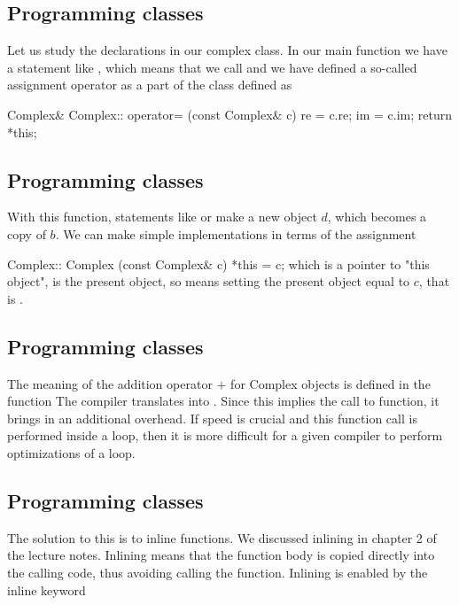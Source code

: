 \documentclass[%
twoside,                 %
final,                   %
10pt]{article}
\begin{document}
{{{{{{{{%
\subsection{Programming classes}

Let us study the declarations in our complex class.
In our main function we have a statement like , which means
that we call  and we have defined a so-called assignment operator
as a part of the class defined as

\bcppcod
Complex& Complex:: operator= (const Complex& c)
{
   re = c.re;
   im = c.im;
   return *this;
}
\ecppcod

\subsection{Programming classes}

With this function, statements like
 or 
make a new object $d$, which becomes a copy of $b$.
We can make simple implementations in terms of the assignment

\bcppcod
Complex:: Complex (const Complex& c)
{ *this = c; }
\ecppcod
which  is a pointer to "this object",  is the present object,
so  means setting the present object equal to $c$, that is
.

\subsection{Programming classes}

The meaning of the addition operator $+$ for Complex objects is defined in the
function
The compiler translates  into .
Since this implies the call to function, it brings in an additional overhead. If speed
is crucial and this function call is performed inside a loop, then it is more difficult for a
given compiler to perform optimizations of a loop.

\subsection{Programming classes}

The solution to this is to inline functions.   We discussed inlining in chapter
2 of the lecture notes.
Inlining means that the function body is copied directly into
the calling code, thus avoiding calling the function.
Inlining is enabled by the inline keyword

}}}}}}}}
\end{document}
